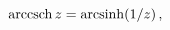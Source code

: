 \[\mathop{\mathrm{arccsch}\/}\nolimits z=\mathop{\mathrm{arcsinh}\/}\nolimits\!%
\left(1/z\right),\]